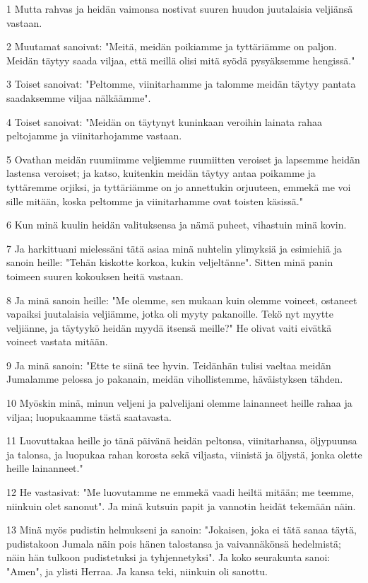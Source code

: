 \par 1 Mutta rahvas ja heidän vaimonsa nostivat suuren huudon juutalaisia veljiänsä vastaan.
\par 2 Muutamat sanoivat: "Meitä, meidän poikiamme ja tyttäriämme on paljon. Meidän täytyy saada viljaa, että meillä olisi mitä syödä pysyäksemme hengissä."
\par 3 Toiset sanoivat: "Peltomme, viinitarhamme ja talomme meidän täytyy pantata saadaksemme viljaa nälkäämme".
\par 4 Toiset sanoivat: "Meidän on täytynyt kuninkaan veroihin lainata rahaa peltojamme ja viinitarhojamme vastaan.
\par 5 Ovathan meidän ruumiimme veljiemme ruumiitten veroiset ja lapsemme heidän lastensa veroiset; ja katso, kuitenkin meidän täytyy antaa poikamme ja tyttäremme orjiksi, ja tyttäriämme on jo annettukin orjuuteen, emmekä me voi sille mitään, koska peltomme ja viinitarhamme ovat toisten käsissä."
\par 6 Kun minä kuulin heidän valituksensa ja nämä puheet, vihastuin minä kovin.
\par 7 Ja harkittuani mielessäni tätä asiaa minä nuhtelin ylimyksiä ja esimiehiä ja sanoin heille: "Tehän kiskotte korkoa, kukin veljeltänne". Sitten minä panin toimeen suuren kokouksen heitä vastaan.
\par 8 Ja minä sanoin heille: "Me olemme, sen mukaan kuin olemme voineet, ostaneet vapaiksi juutalaisia veljiämme, jotka oli myyty pakanoille. Tekö nyt myytte veljiänne, ja täytyykö heidän myydä itsensä meille?" He olivat vaiti eivätkä voineet vastata mitään.
\par 9 Ja minä sanoin: "Ette te siinä tee hyvin. Teidänhän tulisi vaeltaa meidän Jumalamme pelossa jo pakanain, meidän vihollistemme, häväistyksen tähden.
\par 10 Myöskin minä, minun veljeni ja palvelijani olemme lainanneet heille rahaa ja viljaa; luopukaamme tästä saatavasta.
\par 11 Luovuttakaa heille jo tänä päivänä heidän peltonsa, viinitarhansa, öljypuunsa ja talonsa, ja luopukaa rahan korosta sekä viljasta, viinistä ja öljystä, jonka olette heille lainanneet."
\par 12 He vastasivat: "Me luovutamme ne emmekä vaadi heiltä mitään; me teemme, niinkuin olet sanonut". Ja minä kutsuin papit ja vannotin heidät tekemään näin.
\par 13 Minä myös pudistin helmukseni ja sanoin: "Jokaisen, joka ei tätä sanaa täytä, pudistakoon Jumala näin pois hänen talostansa ja vaivannäkönsä hedelmistä; näin hän tulkoon pudistetuksi ja tyhjennetyksi". Ja koko seurakunta sanoi: "Amen", ja ylisti Herraa. Ja kansa teki, niinkuin oli sanottu.

